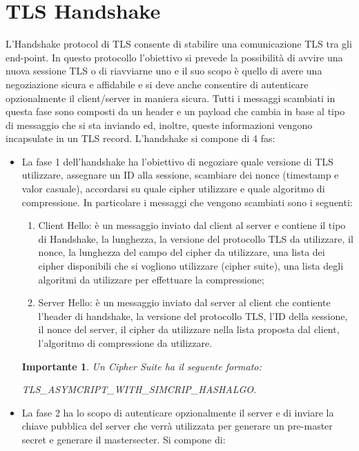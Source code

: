\documentclass{article}
\newtheorem*{importante}{\textbf{Importante}\newline}
\begin{document}
\section{TLS Handshake}
L'Handshake protocol di TLS consente di stabilire una comunicazione TLS tra gli end-point\@. In questo protocollo l'obiettivo si prevede la possibilità di avvire una nuova sessione TLS o di riavviarne uno e il suo scopo è quello di avere una negoziazione sicura e affidabile e si deve anche consentire di autenticare opzionalmente il client/server in maniera sicura\@. Tutti i messaggi scambiati in questa fase sono composti da un header e un payload che cambia in base al tipo di messaggio che si sta inviando ed, inoltre, queste informazioni vengono incapsulate in un TLS record.\newline
L'handshake si compone di 4 fas:\begin{itemize}
    \item La fase 1 dell'handshake ha l'obiettivo di negoziare quale versione di TLS utilizzare, assegnare un ID alla sessione, scambiare dei nonce (timestamp e valor casuale), accordarsi su quale cipher utilizzare e quale algoritmo di compressione\@. In particolare i messaggi che vengono scambiati sono i seguenti:\begin{enumerate}
        \item Client Hello: è un messaggio inviato dal client al server e contiene il tipo di Handshake, la lunghezza, la versione del protocollo TLS da utilizzare, il nonce, la lunghezza del campo del cipher da utilizzare, una lista dei cipher disponibili che si vogliono utilizzare (cipher suite), una lista degli algoritmi da utilizzare per effettuare la compressione;
        \item Server Hello: è un messaggio inviato dal server al client che contiente l'header di handshake, la versione del protocollo TLS, l'ID della sessione, il nonce del server, il cipher da utilizzare nella lista proposta dal client, l'algoritmo di compressione da utilizzare\@.
    \end{enumerate}
    \begin{importante}
        Un Cipher Suite ha il seguente formato:\begin{center}
            TLS\_ASYMCRIPT\_WITH\_SIMCRIP\_HASHALGO\@.
        \end{center}
    \end{importante}
    \item La fase 2 ha lo scopo di autenticare opzionalmente il server e di inviare la chiave pubblica del server che verrà utilizzata per generare un pre-master secret e generare il mastersecter\@. Si compone di:\begin{enumerate}

\end{enumerate}
\end{itemize}
\end{document}

